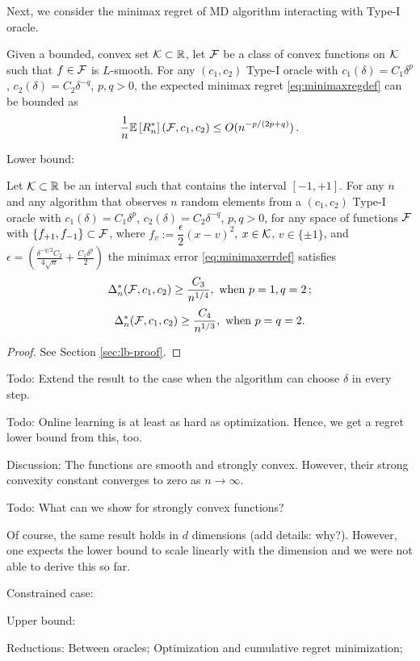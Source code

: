 Next, we consider the minimax regret of MD algorithm interacting with Type-I oracle.
\begin{theorem}
Given a bounded, convex set $\mathcal{K} \subset \mathbb{R}$,
let $\mathcal{F}$ be a class of convex functions on $\mathcal{K}$ such that $f \in \mathcal{F}$ is $L$-smooth.
For any $(c_1,c_2)$ Type-I oracle 
 with $c_1(\delta) = C_1 \delta^p$, $c_2(\delta) = C_2 \delta^{-q}$, $p,q>0$, the expected minimax regret \eqref{eq:minimaxregdef} can be bounded as
 \begin{align*}
\dfrac{1}{n} \mathbb{E}\left[ R_n^* \right](\mathcal{F},c_1,c_2) \leq O(n^{-p/(2p+q)})\,.
 \end{align*}
\end{theorem}

Lower bound:
\begin{theorem}
Let $\mathcal{K}\subset \mathbb{R}$ be an interval such that contains the interval $[-1,+1]$.
 For any $n$ and any algorithm that observes $n$ random elements from a $(c_1,c_2)$ Type-I oracle 
 with $c_1(\delta) = C_1 \delta^p$, $c_2(\delta) = C_2 \delta^{-q}$, $p,q>0$,
 for any space of functions $\mathcal{F}$ with $\{f_{+1}, f_{-1} \}\subset \mathcal{F}$, 
 where $f_v:= \dfrac{\epsilon}{2} (x - v)^2$, $x\in \mathcal{K}$, $v\in \{\pm 1\}$,
and $\epsilon = \left(\frac{\delta^{-q/2}C_2}{4\sqrt{n}} + \frac{C_1\delta^p}{2}\right)$ 
 the minimax error \eqref{eq:minimaxerrdef} satisfies
\[
\Delta_n^*(\mathcal{F}, c_1,c_2) \ge \dfrac{C_3}{ n^{1/4}}, \text{ when } p=1, q=2\,; 
\]
 \[
 \Delta_n^*(\mathcal{F}, c_1,c_2) \ge \dfrac{C_4}{ n^{1/3}},  \text{ when } p=q=2.
 \]
\end{theorem}
\begin{proof}
 See Section \ref{sec:lb-proof}.
\end{proof}
Todo: Extend the result to the case when the algorithm can choose $\delta$ in every step.

Todo: Online learning is at least as hard as optimization. Hence, we get a regret lower bound from this, too.

Discussion: The functions are smooth and strongly convex.
However, their strong convexity constant converges to zero as $n\to\infty$.

Todo: What can we show for strongly convex functions?

Of course, the same result holds in $d$ dimensions (add details: why?). However, one expects the lower bound to scale linearly with the dimension and we were not able to derive this so far.

Constrained case:

Upper bound: 

Reductions:
Between oracles;
Optimization and cumulative regret minimization;


